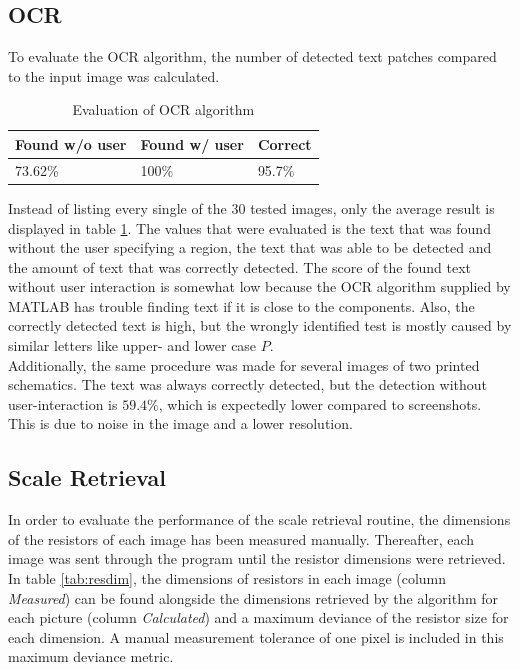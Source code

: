 \documentclass[10pt,twocolumn,letterpaper]{article}
\begin{document}
\subsection{OCR}

To evaluate the OCR algorithm, the number of detected text patches compared to the input image was calculated. 

\begin{table}[!ht]
\centering
\caption{Evaluation of OCR algorithm}
\label{tab:ocr}
\begin{tabular}{|l|l|l|}
\hline
Found w/o user & Found w/ user & Correct \\ \hline
73.62\%        & 100\%         & 95.7\%  \\ \hline
\end{tabular}
\end{table}

Instead of listing every single of the 30 tested images, only the average result is displayed in table \ref{tab:ocr}. The values that were evaluated is the text that was found without the user specifying a region, the text that was able to be detected and the amount of text that was correctly detected. The score of the found text without user interaction is somewhat low because the OCR algorithm supplied by MATLAB has trouble finding text if it is close to the components. Also, the correctly detected text is high, but the wrongly identified test is mostly caused by similar letters like upper- and lower case $P$.\\
Additionally, the same procedure was made for several images of two printed schematics. The text was always correctly detected, but the detection without user-interaction is $59.4\%$, which is expectedly lower compared to screenshots. This is due to noise in the image and a lower resolution.

\subsection{Scale Retrieval}

In order to evaluate the performance of the scale retrieval routine, the dimensions of the resistors of each image has been measured manually. Thereafter, each image was sent through the program until the resistor dimensions were retrieved. In table \ref{tab:resdim}, the dimensions of resistors in each image (column \textit{Measured}) can be found alongside the dimensions retrieved by the algorithm for each picture (column \textit{Calculated}) and a maximum deviance of the resistor size for each dimension. A manual measurement tolerance of one pixel is included in this maximum deviance metric.
\par
\end{document}
